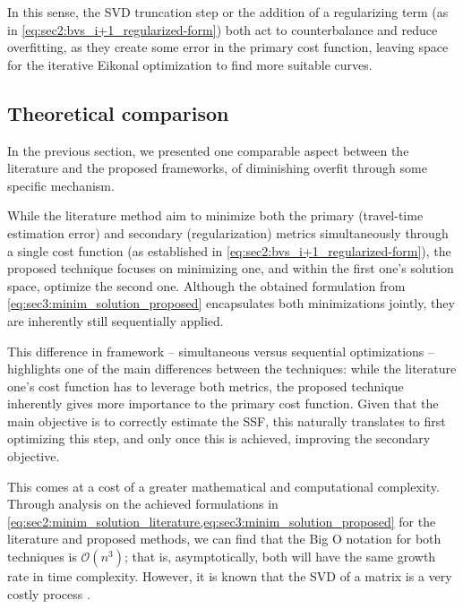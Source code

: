 In this sense, the SVD truncation step or the addition of a regularizing term (as in \cref{eq:sec2:bvs_i+1_regularized-form}) both act to counterbalance and reduce overfitting, as they create some error in the primary cost function, leaving space for the iterative Eikonal optimization to find more suitable curves.

\subsection{Theoretical comparison}

In the previous section, we presented one comparable aspect between the literature and the proposed frameworks, of diminishing overfit through some specific mechanism.

While the literature method aim to minimize both the primary (travel-time estimation error) and secondary (regularization) metrics simultaneously through a single cost function (as established in \cref{eq:sec2:bvs_i+1_regularized-form}), the proposed technique focuses on minimizing one, and within the first one's solution space, optimize the second one. Although the obtained formulation from \cref{eq:sec3:minim_solution_proposed} encapsulates both minimizations jointly, they are inherently still sequentially applied.

This difference in framework -- simultaneous versus sequential optimizations -- highlights one of the main differences between the techniques: while the literature one's cost function has to leverage both metrics, the proposed technique inherently gives more importance to the primary cost function. Given that the main objective is to correctly estimate the SSF, this naturally translates to first optimizing this step, and only once this is achieved, improving the secondary objective.

This comes at a cost of a greater mathematical and computational complexity. Through analysis on the achieved formulations in \cref{eq:sec2:minim_solution_literature,eq:sec3:minim_solution_proposed} for the literature and proposed methods, we can find that the Big O notation \cite{big O} for both techniques is $\mathcal{O}(n^3)$; that is, asymptotically, both will have the same growth rate in time complexity. However, it is known that the SVD of a matrix is a very costly process \cite{svd computational costly}.

